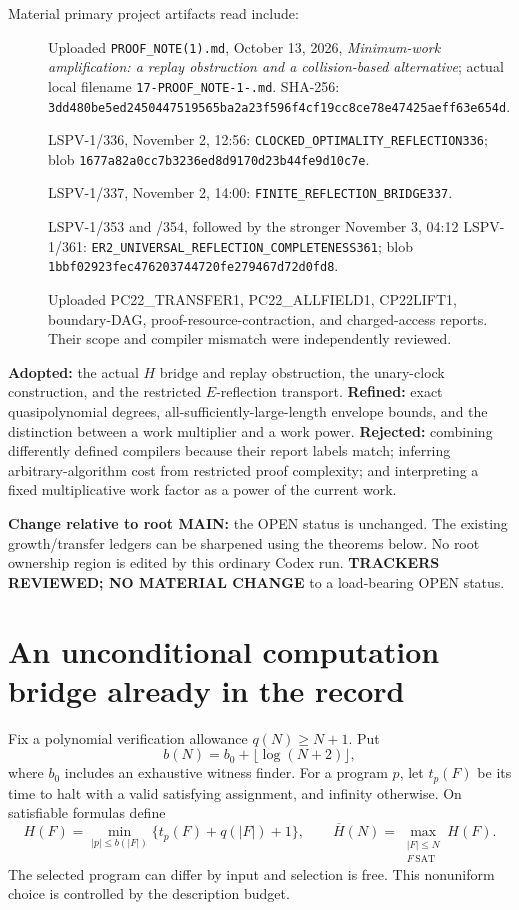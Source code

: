 \documentclass[11pt]{article}
\newcommand{\Hbar}{\overline H}
\begin{document}
Material primary project artifacts read include:
\begin{description}
\item[] Uploaded \texttt{PROOF\_NOTE(1).md}, October 13, 2026,
\emph{Minimum-work amplification: a replay obstruction and a collision-based
alternative}; actual local filename \texttt{17-PROOF\_NOTE-1-.md}.
SHA-256:
\texttt{3dd480be5ed2450447519565ba2a23f596f4cf19cc8ce78e47425aeff63e654d}.
\item[] LSPV-1/336, November 2, 12:56:
\texttt{CLOCKED\_OPTIMALITY\_REFLECTION336}; blob
\texttt{1677a82a0cc7b3236ed8d9170d23b44fe9d10c7e}.
\item[] LSPV-1/337, November 2, 14:00:
\texttt{FINITE\_REFLECTION\_BRIDGE337}.
\item[] LSPV-1/353 and /354, followed by the stronger November 3, 04:12
LSPV-1/361:
\texttt{ER2\_UNIVERSAL\_REFLECTION\_COMPLETENESS361}; blob
\texttt{1bbf02923fec476203744720fe279467d72d0fd8}.
\item[] Uploaded PC22\_TRANSFER1, PC22\_ALLFIELD1, CP22LIFT1, boundary-DAG,
proof-resource-contraction, and charged-access reports. Their scope and
compiler mismatch were independently reviewed.
\end{description}

\textbf{Adopted:} the actual $H$ bridge and replay obstruction, the unary-clock
construction, and the restricted $E$-reflection transport.
\textbf{Refined:} exact quasipolynomial degrees, all-sufficiently-large-length
envelope bounds, and the distinction between a work multiplier and a work
power.
\textbf{Rejected:} combining differently defined compilers because their
report labels match; inferring arbitrary-algorithm cost from restricted
proof complexity; and interpreting a fixed multiplicative work factor as
a power of the current work.

\textbf{Change relative to root MAIN:} the OPEN status is unchanged.
The existing growth/transfer ledgers can be sharpened using the theorems
below. No root ownership region is edited by this ordinary Codex run.
\textbf{TRACKERS REVIEWED; NO MATERIAL CHANGE} to a load-bearing OPEN status.

\section{An unconditional computation bridge already in the record}

Fix a polynomial verification allowance $q(N)\ge N+1$. Put
\[
 b(N)=b_0+\lfloor\log(N+2)\rfloor,
\]
where $b_0$ includes an exhaustive witness finder. For a program $p$, let
$t_p(F)$ be its time to halt with a valid satisfying assignment, and
infinity otherwise. On satisfiable formulas define
\[
 H(F)=\min_{|p|\le b(|F|)}
       \{t_p(F)+q(|F|)+1\},\qquad
 \Hbar(N)=\max_{\substack{|F|\le N\\F\ \mathrm{SAT}}}H(F).
 \tag{1}
\]
The selected program can differ by input and selection is free. This
nonuniform choice is controlled by the description budget.
\end{document}
